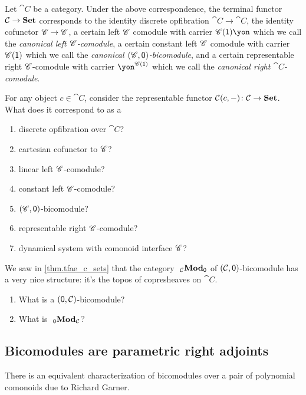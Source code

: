 \documentclass[Book-Poly]{subfiles}
\begin{document}
Let $\cat{C}$ be a category. Under the above correspondence, the terminal functor $\mathcal{C}\to\mathbf{Set}$ corresponds to the identity discrete opfibration $\cat{C}\to\cat{C}$, the identity cofunctor $\mathscr{C}\to\mathscr{C}$, a certain left $\mathscr{C}$ comodule with carrier $\com{C}(\1)\yon$ which we call the \emph{canonical left $\mathscr{C}$-comodule}, a certain constant left $\mathscr{C}$ comodule with carrier $\mathscr{C}(\textsf{1})$ which we call the \emph{canonical $(\mathscr{C},\textsf{0})$-bicomodule}, and a certain representable right $\mathscr{C}$-comodule with carrier $\yon^{\com{C}(\1)}$ which we call the \emph{canonical right $\cat{C}$-comodule}.

\begin{exercise}
For any object $c\in \cat{C}$, consider the representable functor $\mathcal{C}(c,-)\colon\mathcal{C}\to\mathbf{Set}$. What does it correspond to as a
\begin{enumerate}
	\item discrete opfibration over $\cat{C}$?
	\item cartesian cofunctor to $\mathscr{C}$?
	\item linear left $\mathscr{C}$-comodule?
	\item constant left $\mathscr{C}$-comodule?
	\item $(\mathscr{C},\textsf{0})$-bicomodule?
	\item representable right $\mathscr{C}$-comodule?
	\item dynamical system with comonoid interface $\mathscr{C}$?
\qedhere
\end{enumerate}
\end{exercise}

\begin{exercise}
We saw in \cref{thm.tfae_c_sets} that the category $~_{\mathcal{C}}\mathbf{Mod}_{\textsf{0}}$ of $(\mathcal{C},\textsf{0})$-bicomodule has a very nice structure: it's the topos of copresheaves on $\cat{C}$. 
\begin{enumerate}
	\item What is a $(\textsf{0},\mathcal{C})$-bicomodule?
	\item What is $~_{\textsf{0}}\mathbf{Mod}_{\mathcal{C}}$?
\qedhere
\end{enumerate}
\end{exercise}

\subsection{Bicomodules are parametric right adjoints}

There is an equivalent characterization of bicomodules over a pair of polynomial comonoids due to Richard Garner.
\end{document}

